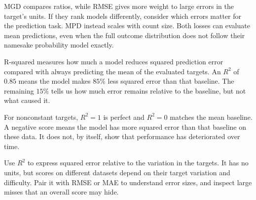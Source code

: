 MGD compares ratios, while RMSE gives more weight to large errors in the target's units. If they rank models differently, consider which errors matter for the prediction task. MPD instead scales with count size. Both losses can evaluate mean predictions, even when the full outcome distribution does not follow their namesake probability model exactly.

\metricend
\clearpage
\thispagestyle{regressionstyle}
\label{sec:r-squared}

R-squared measures how much a model reduces squared prediction error compared with always predicting the mean of the evaluated targets. An $R^2$ of $0.85$ means the model makes $85\%$ less squared error than that baseline. The remaining $15\%$ tells us how much error remains relative to the baseline, but not what caused it.

\begin{metricformula}
\end{metricformula}

For nonconstant targets, $R^2=1$ is perfect and $R^2=0$ matches the mean baseline. A negative score means the model has more squared error than that baseline on these data. It does not, by itself, show that performance has deteriorated over time.


Use $R^2$ to express squared error relative to the variation in the targets. It has no units, but scores on different datasets depend on their target variation and difficulty. Pair it with RMSE or MAE to understand error sizes, and inspect large misses that an overall score may hide.


